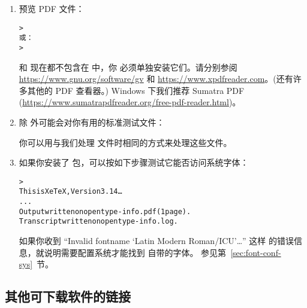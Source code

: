 \documentclass{article}
\begin{document}
\begin{enumerate}
  \item 预览 PDF 文件：
        \begin{alltt}
          > 
          \textrm{或：}
          > 
        \end{alltt}
         和  现在都不包含在 \TL{} 中，你
        必须单独安装它们。请分别参阅 \url{https://www.gnu.org/software/gv} 和
        \url{https://www.xpdfreader.com}。(还有许多其他的 PDF 查看器。)
        Windows 下我们推荐 Sumatra PDF
        (\url{https://www.sumatrapdfreader.org/free-pdf-reader.html})。

  \item 除  外可能会对你有用的标准测试文件：

        你可以用与我们处理  文件时相同的方式来处理这些文件。

  \item 如果你安装了  包，可以按如下步骤测试它能否访问系统字体：
        \begin{alltt}
          > 
          This is XeTeX, Version 3.14\dots
          ...
          Output written on opentype-info.pdf (1 page).
          Transcript written on opentype-info.log.
        \end{alltt}

        如果你收到 ``Invalid fontname `Latin Modern Roman/ICU'\dots'' 这样
        的错误信息，就说明需要配置系统才能找到 \TL{} 自带的字体。
        参见第~\ref{sec:font-conf-sys}~节。

\end{enumerate}

\subsection{其他可下载软件的链接}
\end{document}
